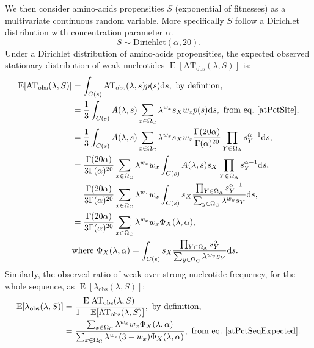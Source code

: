 We then consider amino-acids propensities $S$ (exponential of fitnesses) as a multivariate continuous random variable. More specifically $S$ follow a Dirichlet distribution with concentration parameter $\alpha$.
\begin{equation}
S \sim \mathrm{Dirichlet}(\alpha, 20).
\end{equation}
Under a Dirichlet distribution of amino-acids propensities, the expected observed stationary distribution of weak nucleotides $\operatorname{E} [\mathrm{AT_{obs}}(\lambda, S)]$ is:
\begin{align}
\operatorname{E} [\mathrm{AT_{obs}}(\lambda, S)]
& =\int_{C(s)} \mathrm{AT_{obs}}(\lambda, s) p(s) \der s, \ \textrm{by defintion}, \\
& =\frac{1}{3} \int_{C(s)} A(\lambda, s) \sum_{x \in \SetCodon} 
\lambda^{w_x} s_X w_x p(s) \der s, \ \textrm{from eq.} \ \ref{atPctSite}, \\
& =\frac{1}{3} \int_{ C(s)} A(\lambda, s) \sum_{x \in \SetCodon}  \lambda^{w_x} s_X w_x {\frac {\Gamma (20 \alpha)}{\Gamma (\alpha )^{20}}} \prod_{Y \in \SetAa} s_Y^{\alpha-1} \der s, \\
& ={\frac {\Gamma (20 \alpha)}{3\Gamma (\alpha )^{20}}} \sum_{x \in \SetCodon} \lambda^{w_x} w_x  \int_{ C(s)} A(\lambda, s) s_X \prod_{Y \in \SetAa} s_Y^{\alpha-1} \der s, \\
& ={\frac {\Gamma (20 \alpha)}{3\Gamma (\alpha )^{20}}} \sum_{x \in \SetCodon} \lambda^{w_x} w_x \int_{ C(s)} s_X \dfrac{\prod_{Y \in \SetAa} s_Y^{\alpha-1}}{\sum_{y \in \SetCodon} \lambda^{w_y} s_Y} \der s, \\
& ={\frac {\Gamma (20 \alpha)}{3\Gamma (\alpha )^{20}}} \sum_{x \in \SetCodon} \lambda^{w_x} w_x \Phi_X(\lambda, \alpha),\\
&  \textrm{where} \  \Phi_X(\lambda, \alpha) = \int_{ C(s)} s_X \dfrac{\prod_{Y \in \SetAa} s_Y^{\alpha}}{\sum_{y \in \SetCodon} \lambda^{w_y} s_Y}\der s.
\label{atPctSeqExpected}
\end{align}
Similarly, the observed ratio of weak over strong nucleotide frequency, for the whole sequence, as $\operatorname{E} [\lambda_{\mathrm{obs}}(\lambda, S)]$: 
\begin{align}
\operatorname{E} [\lambda_{\mathrm{obs}}(\lambda, S)]
& =\frac{\operatorname{E} [\mathrm{AT_{obs}}(\lambda, S)]}{ 1 - \operatorname{E} [\mathrm{AT_{obs}}(\lambda, S)] }, \ \textrm{by definition},\\
& =\frac{\sum_{x \in \Omega_{\mathrm{C}}} \lambda^{w_x} w_x \Phi_X(\lambda, \alpha)}{\sum_{x \in \Omega_{\mathrm{C}}} \lambda^{w_x} (3 - w_x) \Phi_X(\lambda, \alpha)}, \ \textrm{from eq.} \ \ref{atPctSeqExpected}.
\label{atgcPctSeqExpected}
\end{align}
